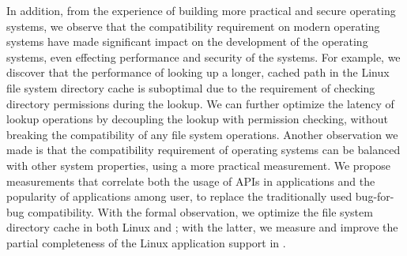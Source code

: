 In addition, from the experience of building more practical and secure operating systems,
we observe that the compatibility requirement on modern operating systems have made significant impact
on the development of the operating systems,
even effecting performance and security of the systems.
For example, we discover that the performance of looking up a longer, cached path in the Linux file system directory cache
is suboptimal due to the requirement of checking directory permissions during the lookup.
We can further optimize the latency of lookup operations
by decoupling the lookup with permission checking,
without breaking the compatibility of any file system operations.
Another observation we made is that
the compatibility requirement of operating systems can be balanced with other system properties,
using a more practical measurement.
We propose measurements that correlate both the usage of APIs in applications
and the popularity of applications among user,
to replace the traditionally used bug-for-bug compatibility.
With the formal observation, we optimize the file system directory cache in both Linux and \graphene{};
with the latter, we measure and improve the partial completeness of the Linux application support in \graphene{}. 


